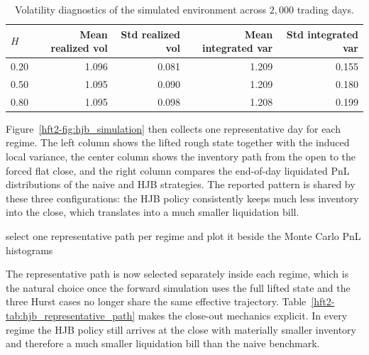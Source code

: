 \begin{table}[H]
\centering
\caption{Volatility diagnostics of the simulated environment across \(2{,}000\) trading days.}
\label{hft2-tab:hjb_vol_diagnostics}
\begin{tabular}{@{}lrrrr@{}}
\toprule
\(H\) & Mean realized vol & Std realized vol & Mean integrated var & Std integrated var \\
\midrule
0.20 & 1.096 & 0.081 & 1.209 & 0.155 \\
0.50 & 1.095 & 0.090 & 1.209 & 0.180 \\
0.80 & 1.095 & 0.098 & 1.208 & 0.199 \\
\bottomrule
\end{tabular}
\end{table}

Figure~\ref{hft2-fig:hjb_simulation} then collects one representative day for each regime. The left column shows the lifted rough state together with the induced local variance, the center column shows the inventory path from the open to the forced flat close, and the right column compares the end-of-day liquidated PnL distributions of the naive and HJB strategies. The reported pattern is shared by these three configurations: the HJB policy consistently keeps much less inventory into the close, which translates into a much smaller liquidation bill.

\begin{algorithm}[H]
\caption{Reading the close-out simulation figure}
\DontPrintSemicolon
{}
select one representative path per regime and plot it beside the Monte Carlo PnL histograms\;
\end{algorithm}

The representative path is now selected separately inside each regime, which is the natural choice once the forward simulation uses the full lifted state and the three Hurst cases no longer share the same effective trajectory. Table~\ref{hft2-tab:hjb_representative_path} makes the close-out mechanics explicit. In every regime the HJB policy still arrives at the close with materially smaller inventory and therefore a much smaller liquidation bill than the naive benchmark.


